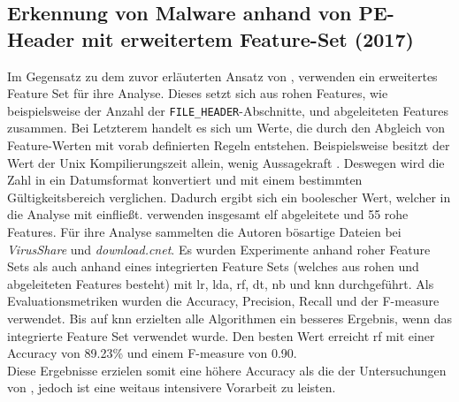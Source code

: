 \documentclass[
    12pt, %
    DIV10,
    ngerman, %
    a4paper, %
    oneside, %
    titlepage, %
    parskip=half, %
    headings=normal, %
    listof=totoc, %
    bibliography=totoc, %
    index=totoc, %
    captions=tableheading, %
    final %
]{scrreprt}
\begin{document}
\subsection{Erkennung von Malware anhand von PE-Header mit erweitertem Feature-Set (2017)}
Im Gegensatz zu dem zuvor erläuterten Ansatz von \textcite{Raff2017}, verwenden \textcite{Kumar2017} ein erweitertes Feature Set für ihre Analyse. Dieses setzt sich aus rohen Features, wie beispielsweise der Anzahl der \texttt{FILE\_HEADER}-Abschnitte, und abgeleiteten Features zusammen. Bei Letzterem handelt es sich um Werte, die durch den Abgleich von Feature-Werten mit vorab definierten Regeln entstehen. Beispielsweise besitzt der Wert der Unix Kompilierungszeit allein, wenig Aussagekraft \parencite{Kumar2017}. Deswegen wird die Zahl in ein Datumsformat konvertiert und mit einem bestimmten Gültigkeitsbereich verglichen. Dadurch ergibt sich ein boolescher Wert, welcher in die Analyse mit einflie{\ss}t. \textcite{Kumar2017} verwenden insgesamt elf abgeleitete und 55 rohe Features. Für ihre Analyse sammelten die Autoren bösartige Dateien bei \emph{VirusShare} und \emph{download.cnet}. Es wurden Experimente anhand roher Feature Sets als auch anhand eines integrierten Feature Sets (welches aus rohen und abgeleiteten Features besteht) mit \ac{lr}, \ac{lda}, \ac{rf}, \ac{dt}, \ac{nb} und \ac{knn} durchgeführt. Als Evaluationsmetriken wurden die Accuracy, Precision, Recall und der F-measure verwendet. Bis auf \ac{knn} erzielten alle Algorithmen ein besseres Ergebnis, wenn das integrierte Feature Set verwendet wurde. Den besten Wert erreicht \ac{rf} mit einer Accuracy von 89.23\% und einem F-measure von 0.90. \\
Diese Ergebnisse erzielen somit eine höhere Accuracy als die der Untersuchungen von \textcite{Raff2017}, jedoch ist eine weitaus intensivere Vorarbeit zu leisten.
%
\end{document}
